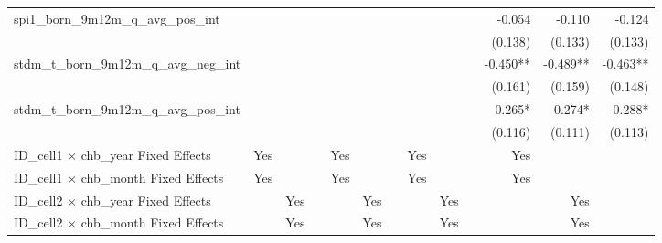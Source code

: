 \begin{tabular}{lrrrrrrrrrrrr}
spi1\_born\_9m12m\_q\_avg\_pos\_int         &              &              &              &              &              &              &              &              &              &       -0.054 &       -0.110 &       -0.124 \\ 
                                            &              &              &              &              &              &              &              &              &              &      (0.138) &      (0.133) &      (0.133) \\ 
stdm\_t\_born\_9m12m\_q\_avg\_neg\_int      &              &              &              &              &              &              &              &              &              &     -0.450** &     -0.489** &     -0.463** \\ 
                                            &              &              &              &              &              &              &              &              &              &      (0.161) &      (0.159) &      (0.148) \\ 
stdm\_t\_born\_9m12m\_q\_avg\_pos\_int      &              &              &              &              &              &              &              &              &              &       0.265* &       0.274* &       0.288* \\ 
                                            &              &              &              &              &              &              &              &              &              &      (0.116) &      (0.111) &      (0.113) \\ 
\midrule
ID\_cell1 $\times$ chb\_year Fixed Effects  &          Yes &              &              &          Yes &              &              &          Yes &              &              &          Yes &              &              \\ 
ID\_cell1 $\times$ chb\_month Fixed Effects &          Yes &              &              &          Yes &              &              &          Yes &              &              &          Yes &              &              \\ 
ID\_cell2 $\times$ chb\_year Fixed Effects  &              &          Yes &              &              &          Yes &              &              &          Yes &              &              &          Yes &              \\ 
ID\_cell2 $\times$ chb\_month Fixed Effects &              &          Yes &              &              &          Yes &              &              &          Yes &              &              &          Yes &              \\ 

\end{tabular}
